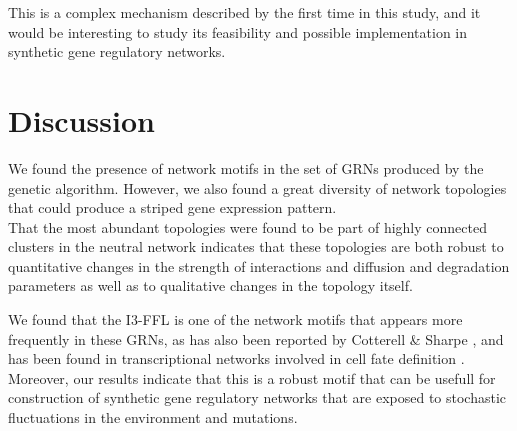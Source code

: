 \documentclass[10pt,letterpaper]{article}
\newcommand{\lorem}{{\bf LOREM}}
\newcommand{\ipsum}{{\bf IPSUM}}
\begin{document}
This is a complex mechanism described by the first time in this study, and it
would be interesting to study its feasibility and possible implementation in
synthetic gene regulatory networks.

% 
% 
% 
% 
% 

\section*{Discussion}

We found the presence of network motifs in the set of GRNs produced by the
genetic algorithm. However, we also found a great diversity of network 
topologies that could produce a striped gene expression pattern.\\

That the most abundant topologies were found to be part of highly connected 
clusters in the neutral network indicates that these topologies are both robust 
to quantitative changes in the strength of interactions and diffusion and 
degradation parameters as well as to qualitative changes in the topology 
itself.

We found that the I3-FFL is one of the network motifs that appears more
frequently in these GRNs, as has also been reported by Cotterell \& Sharpe
\cite{Cotterell2010}, and has been found in transcriptional networks involved 
in cell fate definition \cite{Li2019}. Moreover, our results indicate that this 
is a robust motif that can be usefull for construction of synthetic gene 
regulatory networks that are exposed to stochastic fluctuations in the 
environment and mutations.
\end{document}
